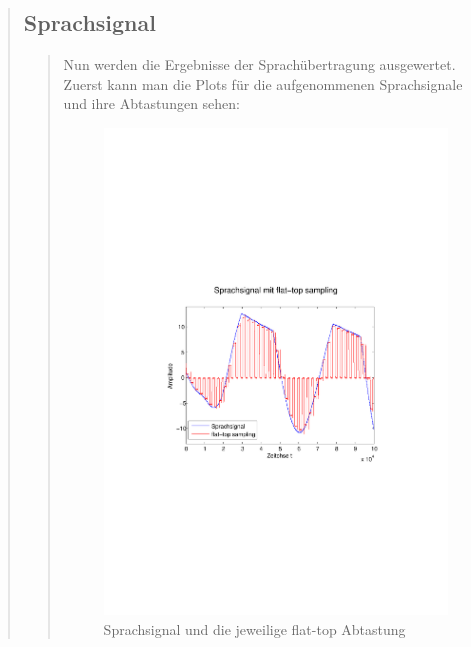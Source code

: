 \begin{quote}
       	
       	
       	\subsection{Sprachsignal}
        \begin{quote}
            Nun werden die Ergebnisse der Sprachübertragung ausgewertet. Zuerst kann
            man die Plots für die aufgenommenen Sprachsignale und ihre Abtastungen
            sehen:
            
            \begin{figure}[H]
            \centering
            \includegraphics[scale=0.6, trim = 3.5cm 9cm 4cm 9cm,
            clip]{./Bilder/sprache_flat-top}
                \caption{Sprachsignal und die jeweilige flat-top Abtastung}
            \end{figure}
            

\end{quote}
\end{quote}
